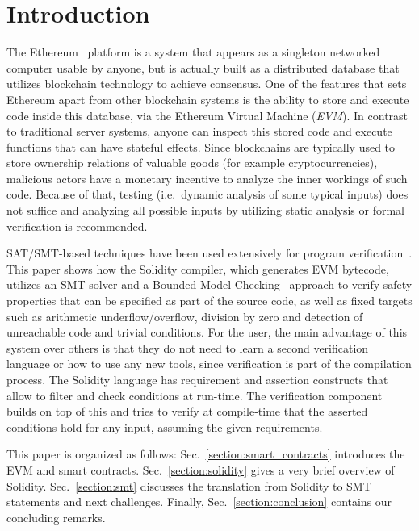 \section{Introduction}
The Ethereum~\cite{WhitePaper} platform is a system that appears as a
singleton networked computer usable by anyone, but is actually built as a
distributed database that utilizes blockchain technology to achieve consensus.
%
One of the features that sets Ethereum apart from other blockchain systems is
the ability to store and execute code inside this database, via the Ethereum
Virtual Machine (\emph{EVM}).
%
In contrast to traditional server systems, anyone can inspect this stored code
and execute functions that can have stateful effects.
%
Since blockchains are typically used to store ownership relations of valuable goods
(for example
cryptocurrencies),
malicious actors have a monetary incentive to analyze the inner
workings of such code. Because of that, testing (i.e.\  dynamic analysis of some
typical inputs) does not suffice and analyzing all possible inputs by utilizing
static analysis or formal verification is recommended.

SAT/SMT-based techniques have been used extensively for program 
verification~\cite{Biere99,Donaldson11,Komuravelli13,Beyer11,Kroening14,Alt17}.
%
This paper shows how the Solidity compiler, which generates EVM bytecode,
utilizes an SMT solver and a Bounded Model Checking~\cite{Biere99} approach to
verify safety properties that can be specified as part of the source code, as
well as fixed targets such as arithmetic underflow/overflow, division by zero and detection of
unreachable code and trivial conditions.
%
For the user, the main advantage of this system over others is that they do not
need to learn a second verification language or how to use any new tools, since
verification is part of the compilation process.
%
The Solidity language has requirement and assertion constructs that allow to
filter and check conditions at run-time.  The verification component
builds on top of this and tries to
verify at compile-time that the asserted conditions hold for any input,
assuming the given requirements.

This paper is organized as follows:  Sec.~\ref{section:smart_contracts}
introduces the EVM and smart contracts.  Sec.~\ref{section:solidity} gives a
very brief overview of Solidity. Sec.~\ref{section:smt} discusses the
translation from Solidity to SMT statements and next challenges. Finally,
Sec.~\ref{section:conclusion} contains our concluding remarks.

